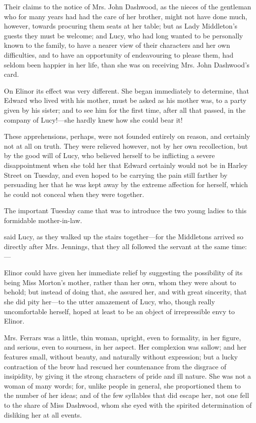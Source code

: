 Their claims to the notice of Mrs. John Dashwood, as the nieces of the gentleman who for many years had had the care of her brother, might not have done much, however, towards procuring them seats at her table; but as Lady Middleton's guests they must be welcome; and Lucy, who had long wanted to be personally known to the family, to have a nearer view of their characters and her own difficulties, and to have an opportunity of endeavouring to please them, had seldom been happier in her life, than she was on receiving Mrs. John Dashwood's card.

On Elinor its effect was very different. She began immediately to determine, that Edward who lived with his mother, must be asked as his mother was, to a party given by his sister; and to see him for the first time, after all that passed, in the company of Lucy!---she hardly knew how she could bear it!

These apprehensions, perhaps, were not founded entirely on reason, and certainly not at all on truth. They were relieved however, not by her own recollection, but by the good will of Lucy, who believed herself to be inflicting a severe disappointment when she told her that Edward certainly would not be in Harley Street on Tuesday, and even hoped to be carrying the pain still farther by persuading her that he was kept away by the extreme affection for herself, which he could not conceal when they were together.

The important Tuesday came that was to introduce the two young ladies to this formidable mother-in-law.

 said Lucy, as they walked up the stairs together---for the Middletons arrived so directly after Mrs. Jennings, that they all followed the servant at the same time:---

Elinor could have given her immediate relief by suggesting the possibility of its being Miss Morton's mother, rather than her own, whom they were about to behold; but instead of doing that, she assured her, and with great sincerity, that she did pity her---to the utter amazement of Lucy, who, though really uncomfortable herself, hoped at least to be an object of irrepressible envy to Elinor.

Mrs. Ferrars was a little, thin woman, upright, even to formality, in her figure, and serious, even to sourness, in her aspect. Her complexion was sallow; and her features small, without beauty, and naturally without expression; but a lucky contraction of the brow had rescued her countenance from the disgrace of insipidity, by giving it the strong characters of pride and ill nature. She was not a woman of many words; for, unlike people in general, she proportioned them to the number of her ideas; and of the few syllables that did escape her, not one fell to the share of Miss Dashwood, whom she eyed with the spirited determination of disliking her at all events.

